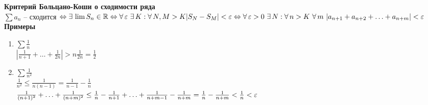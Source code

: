 \documentclass[12pt]{article}
\begin{document}
\textbf{Критерий Больцано-Коши о сходимости ряда}\\
$\sum a_n$ -- сходится $\Leftrightarrow \exists\, \lim S_n \in \mathbb{R} \Leftrightarrow \forall\, \varepsilon\ \exists\, K: \forall\, N,M > K |S_N-S_M| < \varepsilon \Leftrightarrow \forall\, \varepsilon > 0\ \exists\, N: \forall\, n>K\ \forall\, m\ |a_{n+1} + a_{n+2} + \ldots + a_{n+m}| < \varepsilon$\\
\textbf{Примеры}
\begin{enumerate}
    \item $\sum \frac1n$\\
    $|\frac1{n+1} + \ldots + \frac1{2n}| > n\frac1{2n} = \frac12$
    \item $\sum \frac1{n^2}$\\
    $\frac1{n^2} \leq \frac1{n(n-1)} = \frac1{n-1}-\frac1n$\\
    $\frac1{(n+1)^2} + \ldots + \frac1{(n+m)^2} \leq \frac1n - \frac1{n+1} + \ldots + \frac1{n+m-1} - \frac1{n+m} = \frac1n - \frac1{n+m} < \frac1n < \varepsilon$
\end{enumerate}
\end{document}
